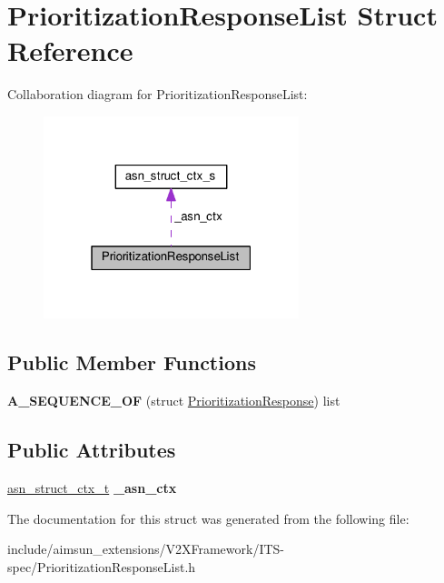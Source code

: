 \hypertarget{structPrioritizationResponseList}{}\section{Prioritization\+Response\+List Struct Reference}
\label{structPrioritizationResponseList}


Collaboration diagram for Prioritization\+Response\+List\+:\nopagebreak
\begin{figure}[H]
\begin{center}
\leavevmode
\includegraphics[width=211pt]{structPrioritizationResponseList__coll__graph}
\end{center}
\end{figure}
\subsection*{Public Member Functions}
\begin{DoxyCompactItemize}
\item 
{\bfseries A\+\_\+\+S\+E\+Q\+U\+E\+N\+C\+E\+\_\+\+OF} (struct \hyperlink{structPrioritizationResponse}{Prioritization\+Response}) list\hypertarget{structPrioritizationResponseList_a38bd9bbff75c4591b6350f2b401fdd79}{}\label{structPrioritizationResponseList_a38bd9bbff75c4591b6350f2b401fdd79}

\end{DoxyCompactItemize}
\subsection*{Public Attributes}
\begin{DoxyCompactItemize}
\item 
\hyperlink{structasn__struct__ctx__s}{asn\+\_\+struct\+\_\+ctx\+\_\+t} {\bfseries \+\_\+asn\+\_\+ctx}\hypertarget{structPrioritizationResponseList_a7333a30b842e16bfa54428eded494548}{}\label{structPrioritizationResponseList_a7333a30b842e16bfa54428eded494548}

\end{DoxyCompactItemize}


The documentation for this struct was generated from the following file\+:\begin{DoxyCompactItemize}
\item 
include/aimsun\+\_\+extensions/\+V2\+X\+Framework/\+I\+T\+S-\/spec/Prioritization\+Response\+List.\+h\end{DoxyCompactItemize}
